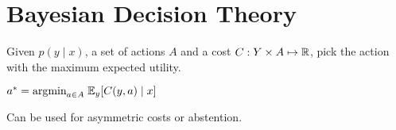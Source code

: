 \section*{Bayesian Decision Theory}

Given $p(y \; | \; x)$, a set of actions $A$ and a cost $C: Y \times A \mapsto \mathbb{R}$, pick the action with the maximum expected utility. 

\qquad \qquad $a^* = \text{argmin}_{a \in A} \; \mathbb{E}_y[C(y,a) \; | \; x]$

Can be used for asymmetric costs or abstention.



